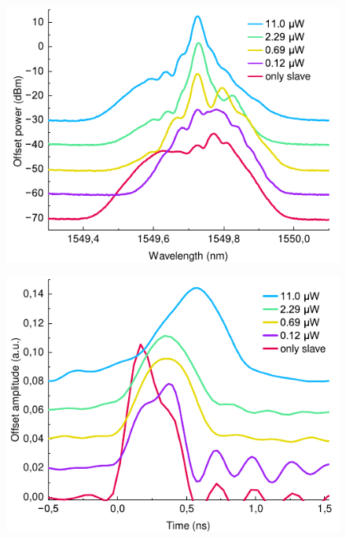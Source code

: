 \begin{figure}
	\centering
	\includegraphics[width=\linewidth]{images/spectra_att.pdf}
	\caption{}
\end{figure}

\begin{figure}
	\centering
	\includegraphics[width=\linewidth]{images/envelope_att.pdf}
	\caption{}
\end{figure}
\label{fig:QKD_att}

